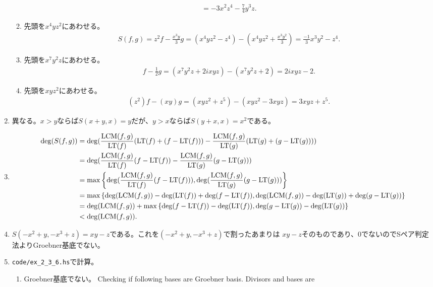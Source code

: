 \documentclass[9pt]{ltjsarticle}
\begin{document}
\begin{enumerate}[label=(問題 \arabic*)]
\begin{enumerate}[label=(\alph*)]
\begin{align}
      =
      -3x^2z^4 - \frac{7}{4}y^3z.
    \end{align}
    \item 先頭を$x^4yz^2$にあわせる。
    \begin{align}
      S(f,g)
      =
      z^2f - \frac{x^3y}{3}g
      =
      (x^4yz^2 - z^4) - (x^4yz^2 + \frac{x^3y^2}{3})
      =
      \frac{-1}{3}x^3y^2 -z^4.
    \end{align}
    \item 先頭を$x^7y^2z$にあわせる。
    \begin{align}
      f- \frac{1}{2}g =
      (x^7y^2z+2ixyz) - (x^7y^2z + 2)
      =
      2ixyz - 2.
    \end{align}
    \item 先頭を$xyz^2$にあわせる。
    \begin{align}
      (z^2)f - (xy)g
      =
      (xyz^2+z^5) - (xyz^2-3xyz)
      =
      3xyz + z^5.
    \end{align}
  \end{enumerate}
  \item
  異なる。$x>y$ならば$S(x+y,x)=y$だが、$y>x$ならば$S(y+x,x)= x^2$である。
  \item
  \begin{align}
    \deg(S(f,g))
    &=
    \deg(\frac{\mathrm{LCM}(f,g)}{{\rm LT}(f)}({\rm LT}(f)+(f-{\rm LT}(f))) - \frac{\mathrm{LCM}(f,g)}{{\rm LT}(g)}({\rm LT}(g)+(g-{\rm LT}(g))))\\
    &=
    \deg(\frac{\mathrm{LCM}(f,g)}{{\rm LT}(f)}(f-{\rm LT}(f)) - \frac{\mathrm{LCM}(f,g)}{{\rm LT}(g)}(g-{\rm LT}(g)))\\
    &=
    \max\left\{\deg(\frac{\mathrm{LCM}(f,g)}{{\rm LT}(f)}(f-{\rm LT}(f))), \deg(\frac{\mathrm{LCM}(f,g)}{{\rm LT}(g)}(g-{\rm LT}(g)))\right\}\\
    &=
    \max\left\{\deg(\mathrm{LCM}(f,g))-\deg({\rm LT}(f))+\deg(f-{\rm LT}(f)),
    \deg(\mathrm{LCM}(f,g))-\deg({\rm LT}(g))+\deg(g-{\rm LT}(g))\right\}\\
    &=
    \deg(\mathrm{LCM}(f,g)) + \max\left\{\deg(f-{\rm LT}(f))-\deg({\rm LT}(f)), \deg(g-{\rm LT}(g))-\deg({\rm LT}(g))\right\}\\
    &<
    \deg(\mathrm{LCM}(f,g)).
  \end{align}
  \item
  $S(-x^2+y,-x^3+z) = xy-z$である。これを$(-x^2+y,-x^3+z)$で割ったあまりは
  $xy-z$そのものであり、0でないのでSペア判定法よりGroebner基底でない。
  \item   {\tt code/ex_2_3_6.hs}で計算。
  \begin{enumerate}[label=(\alph*)]
    \item
      Groebner基底でない。
      Checking if following bases are Groebner basis.
      Divisors and bases are

\end{enumerate}
\end{enumerate}
\end{document}
